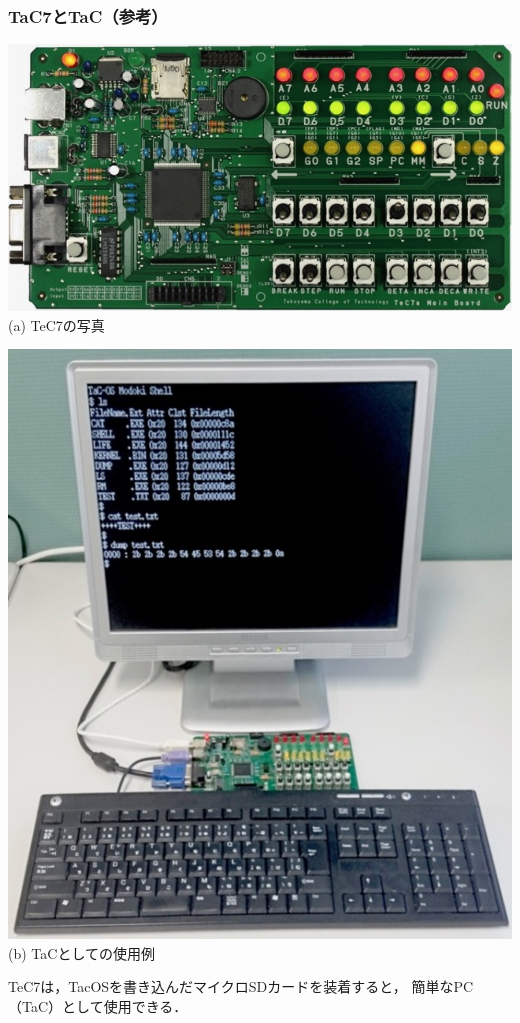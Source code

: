 \documentclass[dvipdfmx]{beamer}
\begin{document}
\begin{frame}
  \frametitle{TaC7とTaC（参考）}
  \begin{minipage}{0.58\columnwidth}
    \begin{center}
      \includegraphics[scale=0.27]{Photo/TeC7.jpg}\\
      (a) TeC7の写真
    \end{center}
  \end{minipage}
  \begin{minipage}{0.38\columnwidth}
    \begin{center}
      \includegraphics[scale=0.22]{Photo/TaC.jpg}\\
      (b) TaCとしての使用例
    \end{center}
  \end{minipage}
\vfill
TeC7は，TacOSを書き込んだマイクロSDカードを装着すると，
簡単なPC（TaC）として使用できる．
\end{frame}
\end{document}
